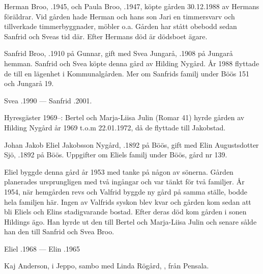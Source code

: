 


Herman Broo, .1945, och Paula Broo, .1947, köpte gården 30.12.1988 av Hermans föräldrar. Vid gården hade Herman och hans son Jari en timmersvarv och tillverkade timmerbyggnader, möbler o.a. Gården har stått obebodd sedan Sanfrid och Sveas tid där. Efter Hermans död är dödsboet ägare.


Sanfrid Broo, .1910 på Gunnar, gift med Svea Jungarå, .1908 på Jungarå hemman. Sanfrid och Svea köpte denna gård av Hilding Nygård. År 1988 flyttade de till en lägenhet i Kommunalgården. Mer om Sanfrids familj under Böös 151 och Jungarå 19.

Svea .1990  ---  Sanfrid .2001.

Hyresgäster 1969--: Bertel och Marja-Liisa Julin (Romar 41) hyrde gården av  Hilding Nygård år 1969 t.o.m 22.01.1972, då de flyttade till Jakobstad.


Johan Jakob Eliel Jakobsson Nygård, .1892 på Böös, gift med Elin Augustsdotter Sjö, .1892 på Böös. Uppgifter om Eliels familj under Böös, gård nr 139.

Eliel byggde denna gård år 1953 med tanke på någon av sönerna. Gården planerades ursprungligen med två ingångar och var tänkt för två familjer. År 1954, när hemgården revs och Valfrid byggde ny gård på samma ställe, bodde hela familjen här. Ingen av Valfrids syskon blev kvar och gården kom sedan att bli Eliels och Elins stadigvarande bostad. Efter deras död kom gården i sonen Hildings ägo. Han hyrde ut den till Bertel och Marja-Liisa Julin och senare sålde han den till Sanfrid och Svea Broo.

Eliel .1968  ---  Elin .1965






Kaj Anderson,  i Jeppo, sambo med Linda Rögård, , från Pensala.

